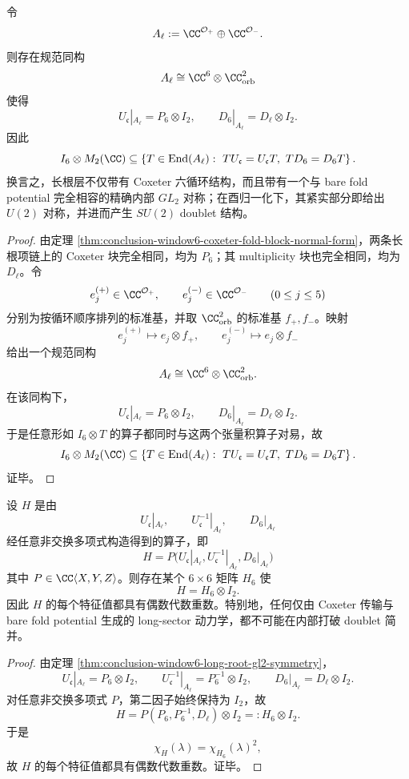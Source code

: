\begin{theorem}\label{thm:conclusion-window6-long-root-gl2-symmetry}
令
\[
A_{\ell}:=\CC^{\mathcal O_{+}}\oplus \CC^{\mathcal O_{-}}.
\]
则存在规范同构
\[
A_{\ell}\cong \CC^6\otimes \CC^2_{\mathrm{orb}}
\]
使得
\[
U_{\mathfrak c}|_{A_{\ell}}=P_6\otimes I_2,\qquad
D_6|_{A_{\ell}}=D_{\ell}\otimes I_2.
\]
因此
\[
I_6\otimes M_2(\CC)\subseteq
\left\{
T\in \operatorname{End}(A_{\ell}):
\ TU_{\mathfrak c}=U_{\mathfrak c}T,\ TD_6=D_6T
\right\}.
\]
换言之，长根层不仅带有 Coxeter 六循环结构，而且带有一个与 bare fold potential 完全相容的精确内部 \(GL_2\) 对称；在酉归一化下，其紧实部分即给出 \(U(2)\) 对称，并进而产生 \(SU(2)\) doublet 结构。
\end{theorem}
\begin{proof}
由定理 \ref{thm:conclusion-window6-coxeter-fold-block-normal-form}，两条长根项链上的 Coxeter 块完全相同，均为 \(P_6\)；其 multiplicity 块也完全相同，均为 \(D_{\ell}\)。令
\[
e_j^{(+)}\in \CC^{\mathcal O_{+}},\qquad
e_j^{(-)}\in \CC^{\mathcal O_{-}}
\qquad (0\le j\le 5)
\]
分别为按循环顺序排列的标准基，并取 \(\CC^2_{\mathrm{orb}}\) 的标准基 \(f_{+},f_{-}\)。映射
\[
e_j^{(+)}\longmapsto e_j\otimes f_{+},\qquad
e_j^{(-)}\longmapsto e_j\otimes f_{-}
\]
给出一个规范同构
\[
A_{\ell}\cong \CC^6\otimes \CC^2_{\mathrm{orb}}.
\]
在该同构下，
\[
U_{\mathfrak c}|_{A_{\ell}}=P_6\otimes I_2,\qquad
D_6|_{A_{\ell}}=D_{\ell}\otimes I_2.
\]
于是任意形如 \(I_6\otimes T\) 的算子都同时与这两个张量积算子对易，故
\[
I_6\otimes M_2(\CC)\subseteq
\left\{
T\in \operatorname{End}(A_{\ell}):
\ TU_{\mathfrak c}=U_{\mathfrak c}T,\ TD_6=D_6T
\right\}.
\]
证毕。
\end{proof}

\begin{corollary}\label{cor:conclusion-window6-even-degeneracy-noncommutative-hamiltonian}
设 \(H\) 是由
\[
U_{\mathfrak c}|_{A_{\ell}},\qquad
U_{\mathfrak c}^{-1}|_{A_{\ell}},\qquad
D_6|_{A_{\ell}}
\]
经任意非交换多项式构造得到的算子，即
\[
H=P\bigl(U_{\mathfrak c}|_{A_{\ell}},U_{\mathfrak c}^{-1}|_{A_{\ell}},D_6|_{A_{\ell}}\bigr)
\]
其中 \(P\in \CC\langle X,Y,Z\rangle\)。则存在某个 \(6\times 6\) 矩阵 \(H_6\) 使
\[
H=H_6\otimes I_2.
\]
因此 \(H\) 的每个特征值都具有偶数代数重数。特别地，任何仅由 Coxeter 传输与 bare fold potential 生成的 long-sector 动力学，都不可能在内部打破 doublet 简并。
\end{corollary}
\begin{proof}
由定理 \ref{thm:conclusion-window6-long-root-gl2-symmetry}，
\[
U_{\mathfrak c}|_{A_{\ell}}=P_6\otimes I_2,\qquad
U_{\mathfrak c}^{-1}|_{A_{\ell}}=P_6^{-1}\otimes I_2,\qquad
D_6|_{A_{\ell}}=D_{\ell}\otimes I_2.
\]
对任意非交换多项式 \(P\)，第二因子始终保持为 \(I_2\)，故
\[
H=P(P_6,P_6^{-1},D_{\ell})\otimes I_2=:H_6\otimes I_2.
\]
于是
\[
\chi_H(\lambda)=\chi_{H_6}(\lambda)^2,
\]
故 \(H\) 的每个特征值都具有偶数代数重数。证毕。
\end{proof}

